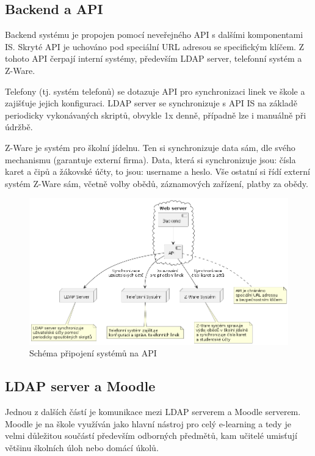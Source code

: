 \documentclass[FM,Proj]{tulthesis}
\begin{document}
\subsection{Backend a API}
\label{section:backend-a-api}
Backend systému je propojen pomocí neveřejného API s dalšími komponentami IS. Skryté API je 
uchováno pod speciální URL adresou se specifickým klíčem. Z tohoto API čerpají interní systémy,
především LDAP server, telefonní systém a Z-Ware.

Telefony (tj. systém telefonů) se dotazuje API pro synchronizaci linek ve škole a zajišťuje 
jejich konfiguraci. LDAP server se synchronizuje s API IS na základě periodicky vykonávaných
skriptů, obvykle 1x denně, případně lze i manuálně při údržbě.

Z-Ware je systém pro školní jídelnu. Ten si synchronizuje data sám, dle svého mechanismu
(garantuje externí firma). Data, která si synchronizuje jsou: čísla karet a čipů a žákovské 
účty, to jsou: username a heslo. Vše ostatní si řídí externí systém Z-Ware sám, včetně volby
obědů, záznamových zařízení, platby za obědy.

\begin{figure}[H]
    \includegraphics[width=\textwidth-28pt]{backend-api.png}
    \caption{Schéma připojení systémů na API}
    \label{fig:backend-api}
\end{figure}

\subsection{LDAP server a Moodle}
\label{section:ldap-server-a-moodle}
Jednou z dalších částí je komunikace mezi LDAP serverem a Moodle serverem. Moodle je na škole
využíván jako hlavní nástroj pro celý e-learning a tedy je velmi důležitou součástí především
odborných předmětů, kam učitelé umisťují většinu školních úloh nebo domácí úkolů.
\end{document}
